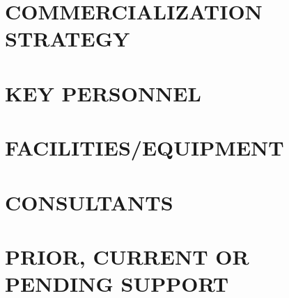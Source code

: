 \documentclass[letterpaper,11pt]{article}
\begin{document}
\section{COMMERCIALIZATION STRATEGY}

\section{KEY PERSONNEL}

\section{FACILITIES/EQUIPMENT}

\section{CONSULTANTS}

\section{PRIOR, CURRENT OR PENDING SUPPORT}
\end{document}
